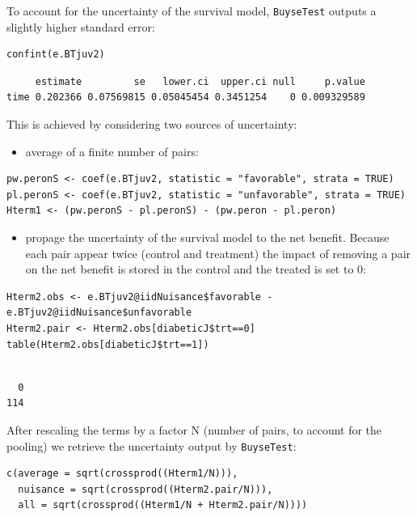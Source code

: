 \documentclass[12pt]{article}
\begin{document}
\clearpage 

To account for the uncertainty of the survival model, \texttt{BuyseTest}
outputs a slightly higher standard error:
\lstset{language=r,label= ,caption= ,captionpos=b,numbers=none}
\begin{lstlisting}
confint(e.BTjuv2)
\end{lstlisting}

\begin{verbatim}
     estimate         se   lower.ci  upper.ci null     p.value
time 0.202366 0.07569815 0.05045454 0.3451254    0 0.009329589
\end{verbatim}


This is achieved by considering two sources of uncertainty:
\begin{itemize}
\item average of a finite number of pairs:
\end{itemize}
\lstset{language=r,label= ,caption= ,captionpos=b,numbers=none}
\begin{lstlisting}
pw.peronS <- coef(e.BTjuv2, statistic = "favorable", strata = TRUE)
pl.peronS <- coef(e.BTjuv2, statistic = "unfavorable", strata = TRUE)
Hterm1 <- (pw.peronS - pl.peronS) - (pw.peron - pl.peron)
\end{lstlisting}

\begin{itemize}
\item propage the uncertainty of the survival model to the net
benefit. Because each pair appear twice (control and treatment) the
impact of removing a pair on the net benefit is stored in the
control and the treated is set to 0:
\end{itemize}
\lstset{language=r,label= ,caption= ,captionpos=b,numbers=none}
\begin{lstlisting}
Hterm2.obs <- e.BTjuv2@iidNuisance$favorable - e.BTjuv2@iidNuisance$unfavorable
Hterm2.pair <- Hterm2.obs[diabeticJ$trt==0]
table(Hterm2.obs[diabeticJ$trt==1])
\end{lstlisting}

\begin{verbatim}

  0 
114
\end{verbatim}


After rescaling the terms by a factor N (number of pairs, to account
for the pooling) we retrieve the uncertainty output by \texttt{BuyseTest}:
\lstset{language=r,label= ,caption= ,captionpos=b,numbers=none}
\begin{lstlisting}
c(average = sqrt(crossprod((Hterm1/N))),
  nuisance = sqrt(crossprod((Hterm2.pair/N))),
  all = sqrt(crossprod((Hterm1/N + Hterm2.pair/N))))
\end{lstlisting}
\end{document}

